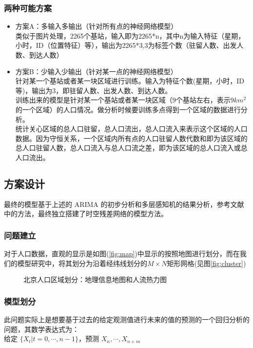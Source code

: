 \subsubsection*{两种可能方案}
\begin{itemize}
	\item 方案A：多输入多输出（针对所有点的神经网络模型）\\
	类似于图片处理，2265个基站，输入即为2265*n，其中n为输入特征（星期，小时，ID（位置特征）等），输出为2265*3,3为标签个数（驻留人数、出发人数、到达人数）
	\item 方案B：少输入少输出（针对某一点的神经网络模型）\\
	针对某一个基站或者某一块区域进行训练。输入为特征个数(星期，小时，ID等)，输出为3，即驻留人数、出发人数、到达人数。\\
	训练出来的模型是针对某一个基站或者某一块区域（9个基站左右，表示$9km^2$的一个区域）的人口情况。做分析时候要训练多点得到一个区域的数据进行分析。\\
	统计关心区域的总人口驻留，总人口流出，总人口流入来表示这个区域的人口数据。因为守恒关系，一个区域内所有点的人口驻留人数代数和即为该区域的总人口驻留人数，总人口流入与总人口流之差，即为该区域的总人口流入或总人口流出。
\end{itemize}


\subsection{方案设计}
最终的模型基于上述的 ARIMA 的初步分析和多层感知机的结果分析，参考文献中的方法，最终独立搭建了时空残差网络的模型方法。
\subsubsection*{问题建立}
对于人口数据，直观的显示是如图(\ref{fig:map})中显示的按照地图进行划分，而在我们的模型研究中，将其划分为沿着经纬线划分的$M \times N$矩形网格(见图\ref{fig:cluster})
\begin{figure}[ht]
\centering
{}
\hfill
\caption{北京人口区域划分：地理信息地图和人流热力图}
\end{figure}
\subsubsection*{模型划分}
此问题实际上是想要基于过去的给定观测值进行未来的值的预测的一个回归分析的问题，其数学表达式为：
\\
给定 $\{X_t | t = 0,\cdots,n-1 \}$，预测 $X_{n},\cdots,X_{n+m}$
